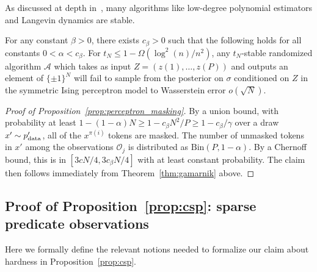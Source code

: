As discussed at depth in~\cite{gamarnik2021overlap}, many algorithms like low-degree polynomial estimators and Langevin dynamics are stable. 

\begin{theorem}\label{thm:gamarnik}
    For any constant $\beta > 0$, there exists $c_\beta > 0$ such that the following holds for all constants $0 < \alpha < c_\beta$. For $t_N \le 1 - \Omega(\log^2(n) / n^2)$, any $t_N$-stable randomized algorithm $\mathcal{A}$ which takes as input $Z = (z{(1)},\ldots,z{(P)})$ and outputs an element of $\{\pm 1\}^N$ will fail to sample from the posterior on $\sigma$ conditioned on $Z$ in the symmetric Ising perceptron model to Wasserstein error $o(\sqrt{N})$.
\end{theorem}


\begin{proof}[Proof of Proposition~\ref{prop:perceptron_masking}]
    By a union bound, with probability at least $1 - (1 - \alpha) N \ge 1 - c_\beta N^2/P \ge 1 - c_\beta /\gamma$ over a draw $x' \sim p'_{\rm data}$, all of the $x^{\pi(i)}$ tokens are masked. The number of unmasked tokens in $x'$ among the observations $\mathcal{O}_j$ is distributed as $\mathrm{Bin}(P, 1 - \alpha)$. By a Chernoff bound, this is in $[3cN/4, 3c_\beta N/4]$ with at least constant probability. The claim then follows immediately from Theorem~\ref{thm:gamarnik} above. 
\end{proof}

\subsection{Proof of Proposition~\ref{prop:csp}: sparse predicate observations}
\label{app:planted_result}

Here we formally define the relevant notions needed to formalize our claim about hardness in Proposition~\ref{prop:csp}.

